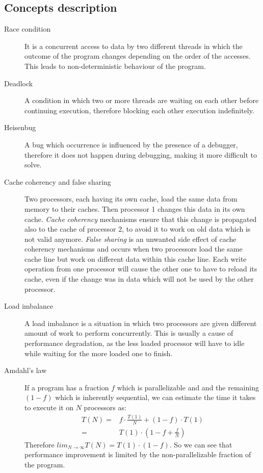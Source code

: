 \documentclass{article}
\begin{document}
\subsection{Concepts description}
\begin{description}
	\item[Race condition]

	It is a concurrent access to data by two different threads in which the outcome of the program changes depending on the order of the accesses. This leads to non-deterministic behaviour of the program.

	\item[Deadlock]

	A condition in which two or more threads are waiting on each other before continuing execution, therefore blocking each other execution indefinitely.
	
	\item[Heisenbug] 

	A bug which occurrence is influenced by the presence of a debugger, therefore it does not happen during debugging, making it more difficult to solve.
	
	\item[Cache coherency and false sharing] 

	Two processors, each having its own cache, load the same data from memory to their caches. Then processor 1 changes this data in its own cache. \emph{Cache coherency} mechanisms ensure that this change is propagated also to the cache of processor 2, to avoid it to work on old data which is not valid anymore. \emph{False sharing} is an unwanted side effect of cache coherency mechanisms and occurs when two processors load the same cache line but work on different data within this cache line. Each write operation from one processor will cause the other one to have to reload its cache, even if the change was in data which will not be used by the other processor.
	
	\item[Load imbalance] 

	A load imbalance is a situation in which two processors are given different amount of work to perform concurrently. This is usually a cause of performance degradation, as the less loaded processor will have to idle while waiting for the more loaded one to finish.
	
	\item[Amdahl's law] 

	If a program has a fraction $f$ which is parallelizable and and the remaining $(1-f)$ which is inherently sequential, we can estimate the time it takes to execute it on $N$ processors as:
	\begin{align}
		T(N) =& f \cdot \frac{T(1)}{N} + (1 - f) \cdot T(1)\\
		=& T(1) \cdot (1 - f + \frac{f}{N})
	\end{align}
	Therefore $lim_{N\to\infty} T(N) = T(1) \cdot (1 - f)$. So we can see that performance improvement is limited by the non-parallelizable fraction of the program.


\end{description}
\end{document}
